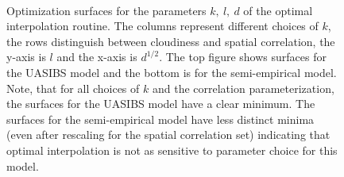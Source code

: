\begin{figure}[p]
\centering
\captionsetup[subfigure]{labelformat=empty}
\vspace{-1em} \\
\caption[Optimization surfaces for OI parameters]{Optimization
surfaces for the parameters $k,\: l,\: d$ of the optimal interpolation
routine. The columns represent different choices of $k$, the rows
distinguish between cloudiness and spatial correlation, the y-axis is
$l$ and the x-axis is $d^{1/2}$. The top figure shows surfaces for the
UASIBS model and the bottom is for the semi-empirical model. Note,
that for all choices of $k$ and the correlation parameterization, the
surfaces for the UASIBS model have a clear minimum. The surfaces for
the semi-empirical model have less distinct minima (even after
rescaling for the spatial correlation set) indicating that optimal
interpolation is not as sensitive to parameter choice for this model.}
\label{fig:paramopt}
\end{figure}


